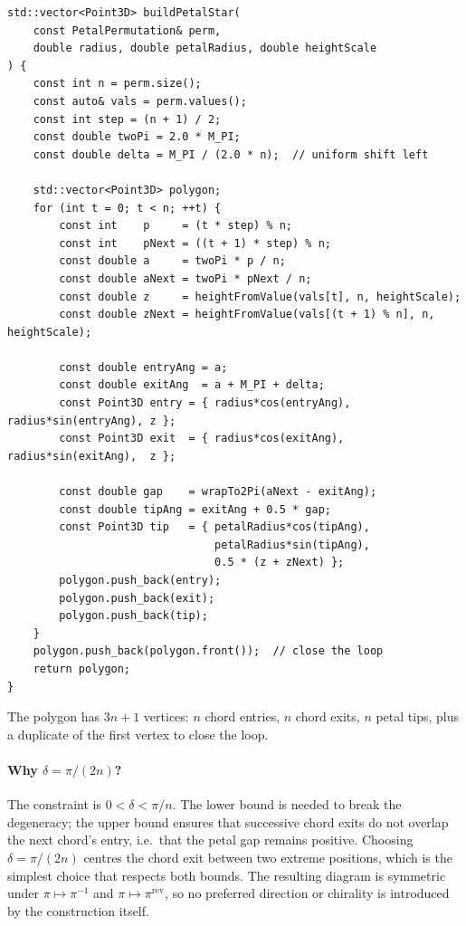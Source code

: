 \documentclass[11pt,oneside]{report}
\theoremstyle{definition}
\begin{document}
\begin{lstlisting}[style=cpp,caption={Polygon construction (\texttt{petal\_star\_clean.cpp})},captionpos=b]
std::vector<Point3D> buildPetalStar(
    const PetalPermutation& perm,
    double radius, double petalRadius, double heightScale
) {
    const int n = perm.size();
    const auto& vals = perm.values();
    const int step = (n + 1) / 2;
    const double twoPi = 2.0 * M_PI;
    const double delta = M_PI / (2.0 * n);  // uniform shift left

    std::vector<Point3D> polygon;
    for (int t = 0; t < n; ++t) {
        const int    p     = (t * step) % n;
        const int    pNext = ((t + 1) * step) % n;
        const double a     = twoPi * p / n;
        const double aNext = twoPi * pNext / n;
        const double z     = heightFromValue(vals[t], n, heightScale);
        const double zNext = heightFromValue(vals[(t + 1) % n], n, heightScale);

        const double entryAng = a;
        const double exitAng  = a + M_PI + delta;
        const Point3D entry = { radius*cos(entryAng), radius*sin(entryAng), z };
        const Point3D exit  = { radius*cos(exitAng),  radius*sin(exitAng),  z };

        const double gap    = wrapTo2Pi(aNext - exitAng);
        const double tipAng = exitAng + 0.5 * gap;
        const Point3D tip   = { petalRadius*cos(tipAng),
                                petalRadius*sin(tipAng),
                                0.5 * (z + zNext) };
        polygon.push_back(entry);
        polygon.push_back(exit);
        polygon.push_back(tip);
    }
    polygon.push_back(polygon.front());  // close the loop
    return polygon;
}
\end{lstlisting}

The polygon has $3n + 1$ vertices: $n$ chord entries, $n$ chord exits, $n$
petal tips, plus a duplicate of the first vertex to close the loop.

\paragraph{Why $\delta = \pi/(2n)$?} The constraint is $0 < \delta < \pi/n$.
The lower bound is needed to break the degeneracy; the upper bound ensures
that successive chord exits do not overlap the next chord's entry, i.e.\
that the petal gap remains positive. Choosing $\delta = \pi/(2n)$ centres
the chord exit between two extreme positions, which is the simplest choice
that respects both bounds. The resulting diagram is symmetric under
$\pi \mapsto \pi^{-1}$ and $\pi \mapsto \pi^{\mathrm{rev}}$, so no preferred
direction or chirality is introduced by the construction itself.
\end{document}
